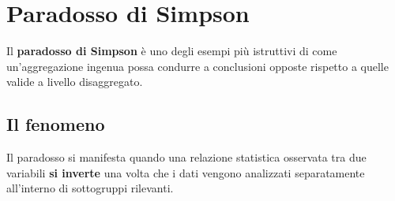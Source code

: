\documentclass[
  italian,
  letterpaper,
  a4paper,
  11pt,
  open=any]{scrbook}
\theoremstyle{plain}
\theoremstyle{definition}
\theoremstyle{definition}
\theoremstyle{remark}
\begin{document}
\section{Paradosso di Simpson}\label{sec-simpsons-paradox}

Il \textbf{paradosso di Simpson} è uno degli esempi più istruttivi di
come un'aggregazione ingenua possa condurre a conclusioni opposte
rispetto a quelle valide a livello disaggregato.

\subsection{Il fenomeno}\label{il-fenomeno}

Il paradosso si manifesta quando una relazione statistica osservata tra
due variabili \textbf{si inverte} una volta che i dati vengono
analizzati separatamente all'interno di sottogruppi rilevanti.
\end{document}
